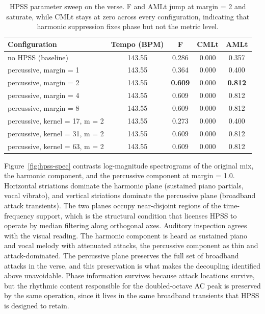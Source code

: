 \documentclass{article}
\begin{document}
\begin{table}[ht]
    \centering
    \caption{HPSS parameter sweep on the verse. F and AMLt jump at margin = 2 and saturate, while CMLt stays at zero across every configuration, indicating that harmonic suppression fixes phase but not the metric level.}
    \label{tab:hpss}
    \begin{tabular}{lcccc}
        \toprule
        Configuration                  & Tempo (BPM) & F              & CMLt  & AMLt           \\
        \midrule
        no HPSS (baseline)             & 143.55      & 0.286          & 0.000 & 0.357          \\
        percussive, margin = 1         & 143.55      & 0.364          & 0.000 & 0.400          \\
        percussive, margin = 2         & 143.55      & \textbf{0.609} & 0.000 & \textbf{0.812} \\
        percussive, margin = 4         & 143.55      & 0.609          & 0.000 & 0.812          \\
        percussive, margin = 8         & 143.55      & 0.609          & 0.000 & 0.812          \\
        percussive, kernel = 17, m = 2 & 143.55      & 0.273          & 0.000 & 0.400          \\
        percussive, kernel = 31, m = 2 & 143.55      & 0.609          & 0.000 & 0.812          \\
        percussive, kernel = 63, m = 2 & 143.55      & 0.609          & 0.000 & 0.812          \\
        \bottomrule
    \end{tabular}
\end{table}

Figure~\ref{fig:hpss-spec} contrasts log-magnitude spectrograms of the original mix, the harmonic component, and the percussive component at margin = 1.0. Horizontal striations dominate the harmonic plane (sustained piano partials, vocal vibrato), and vertical striations dominate the percussive plane (broadband attack transients). The two planes occupy near-disjoint regions of the time-frequency support, which is the structural condition that licenses HPSS to operate by median filtering along orthogonal axes. Auditory inspection agrees with the visual reading. The harmonic component is heard as sustained piano and vocal melody with attenuated attacks, the percussive component as thin and attack-dominated. The percussive plane preserves the full set of broadband attacks in the verse, and this preservation is what makes the decoupling identified above unavoidable. Phase information survives because attack locations survive, but the rhythmic content responsible for the doubled-octave AC peak is preserved by the same operation, since it lives in the same broadband transients that HPSS is designed to retain.
\end{document}
